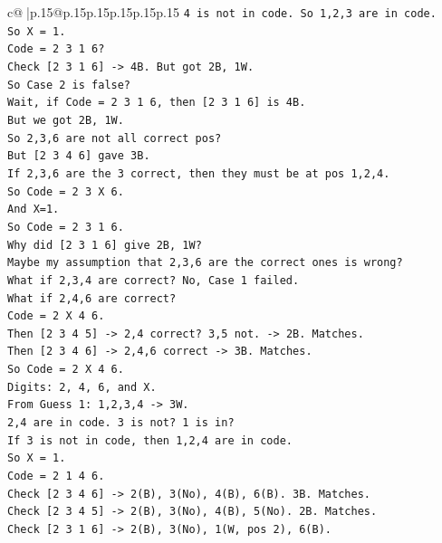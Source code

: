\documentclass{article}
\begin{document}
{\begin{supertabular}{c@{$\;$}|p{.15\linewidth}@{}p{.15\linewidth}p{.15\linewidth}p{.15\linewidth}p{.15\linewidth}p{.15\linewidth}}
{{{\texttt{4 is not in code. So 1,2,3 are in code.} \\
\texttt{So X = 1.} \\
\texttt{Code = 2 3 1 6?} \\
\texttt{Check {[}2 3 1 6{]} {-}> 4B. But got 2B, 1W.} \\
\texttt{So Case 2 is false?} \\
\texttt{Wait, if Code = 2 3 1 6, then {[}2 3 1 6{]} is 4B.} \\
\texttt{But we got 2B, 1W.} \\
\texttt{So 2,3,6 are not all correct pos?} \\
\texttt{But {[}2 3 4 6{]} gave 3B.} \\
\texttt{If 2,3,6 are the 3 correct, then they must be at pos 1,2,4.} \\
\texttt{So Code = 2 3 X 6.} \\
\texttt{And X=1.} \\
\texttt{So Code = 2 3 1 6.} \\
\texttt{Why did {[}2 3 1 6{]} give 2B, 1W?} \\
\texttt{Maybe my assumption that 2,3,6 are the correct ones is wrong?} \\
\texttt{What if 2,3,4 are correct? No, Case 1 failed.} \\
\texttt{What if 2,4,6 are correct?} \\
\texttt{Code = 2 X 4 6.} \\
\texttt{Then {[}2 3 4 5{]} {-}> 2,4 correct? 3,5 not. {-}> 2B. Matches.} \\
\texttt{Then {[}2 3 4 6{]} {-}> 2,4,6 correct {-}> 3B. Matches.} \\
\texttt{So Code = 2 X 4 6.} \\
\texttt{Digits: 2, 4, 6, and X.} \\
\texttt{From Guess 1: 1,2,3,4 {-}> 3W.} \\
\texttt{2,4 are in code. 3 is not? 1 is in?} \\
\texttt{If 3 is not in code, then 1,2,4 are in code.} \\
\texttt{So X = 1.} \\
\texttt{Code = 2 1 4 6.} \\
\texttt{Check {[}2 3 4 6{]} {-}> 2(B), 3(No), 4(B), 6(B). 3B. Matches.} \\
\texttt{Check {[}2 3 4 5{]} {-}> 2(B), 3(No), 4(B), 5(No). 2B. Matches.} \\
\texttt{Check {[}2 3 1 6{]} {-}> 2(B), 3(No), 1(W, pos 2), 6(B).} \\
}}}
\end{supertabular}}
\end{document}
